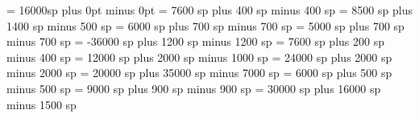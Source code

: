 %
%
%


\greadditionallineswidth = 16000sp
\grezerowidthspace=0pt plus 0pt minus 0pt
\greinterglyphspace = 7600 sp plus 400 sp minus 400 sp
\grealterationspace = 8500 sp plus 1400 sp minus 500 sp
\greclefflatspace = 6000 sp plus 700 sp minus 700 sp
\grebeforechoralsignspace = 5000 sp plus 700 sp minus 700 sp
\grebeforealterationspace = -36000 sp plus 1200 sp minus 1200 sp
\greinterelementspace = 7600 sp plus 200 sp minus 400 sp
\grelargerspace = 12000 sp plus 2000 sp minus 1000 sp
\greglyphspace = 24000 sp plus 2000 sp minus 2000 sp
\grespacebeforecusto = 20000 sp plus 35000 sp minus 7000 sp
\grespacebeforesigns= 6000 sp plus 500 sp minus 500 sp
\grespaceaftersigns= 9000 sp plus 900 sp minus 900 sp
\grespaceafterlineclef = 30000 sp plus 16000 sp minus 1500 sp



